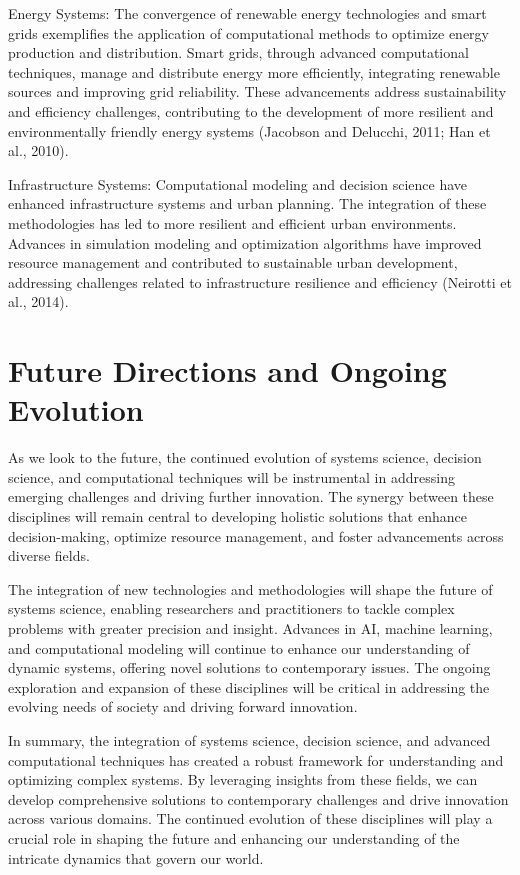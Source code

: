 \documentclass[twocolumn]{article}
\begin{document}
\textcolor{primary}{Energy Systems: The convergence of renewable energy technologies and smart grids exemplifies the application of computational methods to optimize energy production and distribution. Smart grids, through advanced computational techniques, manage and distribute energy more efficiently, integrating renewable sources and improving grid reliability. These advancements address sustainability and efficiency challenges, contributing to the development of more resilient and environmentally friendly energy systems (Jacobson and Delucchi, 2011; Han et al., 2010).}


\textcolor{secondary}{Infrastructure Systems: Computational modeling and decision science have enhanced infrastructure systems and urban planning. The integration of these methodologies has led to more resilient and efficient urban environments. Advances in simulation modeling and optimization algorithms have improved resource management and contributed to sustainable urban development, addressing challenges related to infrastructure resilience and efficiency (Neirotti et al., 2014).}


\section{Future Directions and Ongoing Evolution}

\textcolor{primary}{As we look to the future, the continued evolution of systems science, decision science, and computational techniques will be instrumental in addressing emerging challenges and driving further innovation. The synergy between these disciplines will remain central to developing holistic solutions that enhance decision-making, optimize resource management, and foster advancements across diverse fields.}


\textcolor{secondary}{The integration of new technologies and methodologies will shape the future of systems science, enabling researchers and practitioners to tackle complex problems with greater precision and insight. Advances in AI, machine learning, and computational modeling will continue to enhance our understanding of dynamic systems, offering novel solutions to contemporary issues. The ongoing exploration and expansion of these disciplines will be critical in addressing the evolving needs of society and driving forward innovation.}

\textcolor{primary}{In summary, the integration of systems science, decision science, and advanced computational techniques has created a robust framework for understanding and optimizing complex systems. By leveraging insights from these fields, we can develop comprehensive solutions to contemporary challenges and drive innovation across various domains. The continued evolution of these disciplines will play a crucial role in shaping the future and enhancing our understanding of the intricate dynamics that govern our world.}
\end{document}
